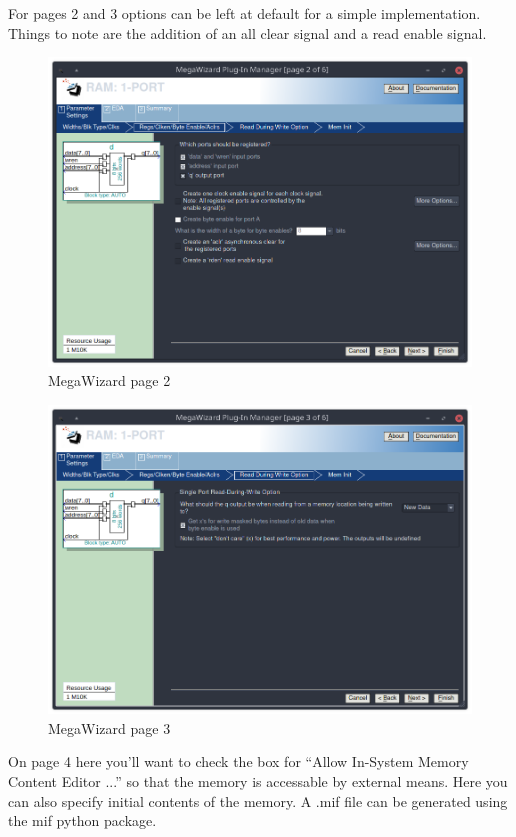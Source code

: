 \documentclass[letter,12pt]{article}
\begin{document}
For pages 2 and 3 options can be left at default for a simple implementation. Things to note are the addition of an  all clear signal and a read enable signal. 
\begin{figure}[H]
  \centering
  \includegraphics[width=.83\linewidth]{pics/Mega2.png}
  \caption{MegaWizard page 2}
\end{figure}
\begin{figure}[H]
  \centering
  \includegraphics[width=.83\linewidth]{pics/Mega3.png}
  \caption{MegaWizard page 3}
\end{figure}

On page 4 here you'll want to check the box for ``Allow In-System Memory Content Editor ...'' so that the memory is accessable by external means. Here you can also specify initial contents of the memory. A .mif file can be generated using the mif python package.
\end{document}
